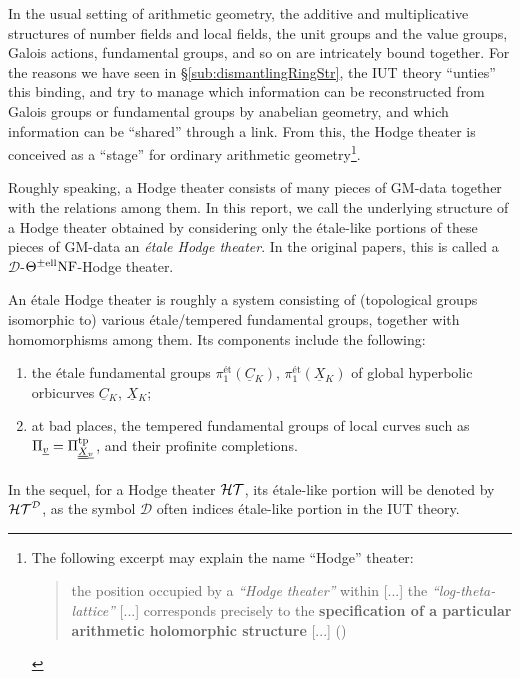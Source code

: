 \documentclass[12pt, reqno, a4paper]{amsart}
\def\udl#1{\underline{#1}} %
\def\uudl#1{\uuline{#1}} %
\def\cD{{\mathcal{D}}}
\def\uv{\udl{v}} %
\def\uuX{\uudl{X}{}} %
\def\et{\textrm{\'et}}
\DeclareMathOperator{\tp}{tp}
\begin{document}
In the usual setting of arithmetic geometry, the additive and multiplicative structures of number fields and local fields, the unit groups and the value groups, Galois actions, fundamental groups, and so on are intricately bound together.
For the reasons we have seen in \S\ref{sub:dismantlingRingStr}, the IUT theory ``unties'' this binding, and try to manage which information can be reconstructed from Galois groups or fundamental groups by anabelian geometry, and which information can be ``shared'' through a link.
From this, the Hodge theater is conceived as a ``stage'' for ordinary arithmetic geometry\footnote{
The following excerpt may explain the name ``Hodge'' theater: 
\begin{quote}
the position occupied by a {\it ``Hodge theater''} within [...]
the {\it ``log-theta-lattice''} [...]
corresponds precisely to the {\bf specification of a particular arithmetic
holomorphic structure} [...] (\cite[Introduction, p.\ 25]{MR4225473})
\end{quote}}.

Roughly speaking, a Hodge theater consists of many pieces of GM-data together with the relations among them.
In this report, we call the underlying structure of a Hodge theater obtained by considering only the \'etale-like portions of these pieces of GM-data an \emph{\'etale Hodge theater}. In the original papers, this is called a $\mathcal{D}$-$\Th^{\pm \mathrm{ell}}\mathrm{NF}$-Hodge theater.

An \'etale Hodge theater is roughly a system consisting of (topological groups isomorphic to) various \'etale/tempered fundamental groups, together with homomorphisms among them. Its components include the following: %
\begin{enumerate}
\item[(1)] the \'etale fundamental groups $\pi_1^{\et}(\underline{C}{}_K)$, $\pi_1^{\et}(\underline{X}{}_K)$ of global hyperbolic orbicurves $\underline{C}{}_K$, $\underline{X}{}_K$; 
\item[(2)] at bad places, the tempered fundamental groups of local curves such as \(\Pi_{\uv}=\Pi^{\tp}_{\uuX_{\uv}}\), and their profinite completions.  
\end{enumerate}

In the sequel, for a Hodge theater $\HT$, its \'etale-like portion will be denoted by $\HT^{\cD}$, as the symbol $\cD$ often indices \'etale-like portion in the IUT theory.
\end{document}
